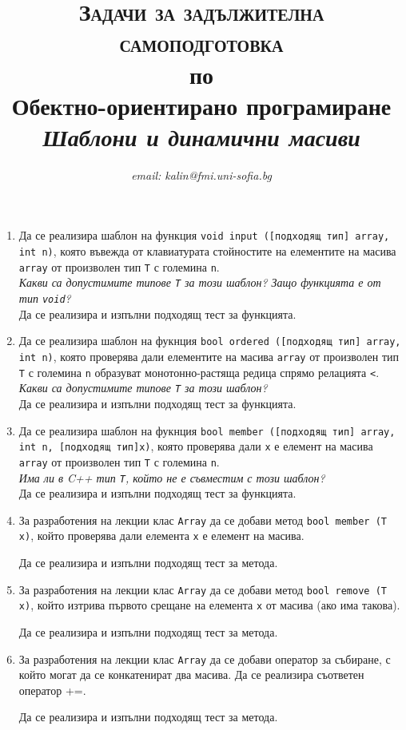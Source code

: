 \documentclass[12pt,a4paper]{article}
\author{\textit{email: kalin@fmi.uni-sofia.bg}}
\title{\textsc{Задачи за задължителна самоподготовка} \\
по \\
Обектно-ориентирано програмиране\\
\textit{Шаблони и динамични масиви}}
\begin{document}
\maketitle


\begin{enumerate}
	\item Да се реализира шаблон на функция \texttt{void input ([подходящ тип] array, int n)}, която въвежда от клавиатурата стойностите на елементите на масива \texttt{array} от произволен тип \texttt{T} с големина \texttt{n}. \\

	\textit{Какви са допустимите типове \texttt{T} за този шаблон? Защо функцията е от тип \texttt{void}?}\\

	Да се реализира и изпълни подходящ тест за функцията.

	\item Да се реализира шаблон на фукнция \texttt{bool ordered ([подходящ тип] array, int n)}, която проверява дали елементите на масива \texttt{array} от произволен тип \texttt{T} с големина \texttt{n} образуват монотонно-растяща редица спрямо релацията \texttt{<}.\\

	\textit{Какви са допустимите типове \texttt{T} за този шаблон?}\\

	Да се реализира и изпълни подходящ тест за функцията.

	\item Да се реализира шаблон на фукнция \texttt{bool member ([подходящ тип] array, int n, [подходящ тип]x)}, която проверява дали \texttt{x} е елемент на масива \texttt{array} от произволен тип \texttt{T} с големина \texttt{n}.\\

	\textit{Има ли в C++ тип \texttt{T}, който не е съвместим с този шаблон?}\\

	Да се реализира и изпълни подходящ тест за функцията.

	\item За разработения на лекции клас \texttt{Array} да се добави метод \texttt{bool member (T x)}, който проверява дали елемента \texttt{x} е елемент на масива.

	Да се реализира и изпълни подходящ тест за метода.

	\item За разработения на лекции клас \texttt{Array} да се добави метод \texttt{bool remove (T x)}, който изтрива първото срещане на елемента \texttt{x} от масива (ако има такова).

	Да се реализира и изпълни подходящ тест за метода.

	\item За разработения на лекции клас \texttt{Array} да се добави оператор за събиране, с който могат да се конкатенират два масива. Да се реализира съответен оператор +=.

	Да се реализира и изпълни подходящ тест за метода.

\end{enumerate}
\end{document}
